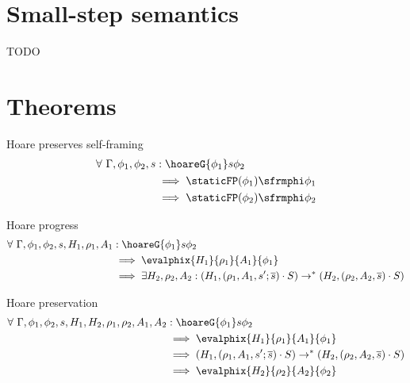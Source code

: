 \documentclass[11pt,a4paper]{scrbook}
\begin{document}
\section{Small-step semantics}
TODO

\section{Theorems}
Hoare preserves self-framing
\begin{align*}
\forall~ \Gamma, \phi_1, \phi_2, s &: \hoareG {\phi_1} s {\phi_2} 
\\ &\implies \staticFP(\phi_1) \sfrmphi \phi_1 
\\ &\implies \staticFP(\phi_2) \sfrmphi \phi_2
\end{align*}

Hoare progress
\begin{align*}
\forall~ \Gamma, \phi_1, \phi_2, s, H_1, \rho_1, A_1 &: \hoareG {\phi_1} s {\phi_2} 
\\ &\implies \evalphix {H_1} {\rho_1} {A_1} {\phi_1}
\\ &\implies \exists H_2, \rho_2, A_2 : (H_1, (\rho_1, A_1, s' ; \overline{s}) \cdot S)
							\rightarrow^* (H_2, (\rho_2, A_2, \overline{s}) \cdot S)
\end{align*}

Hoare preservation
\begin{align*}
\forall~ \Gamma, \phi_1, \phi_2, s, H_1, H_2, \rho_1, \rho_2, A_1, A_2 &: \hoareG {\phi_1} s {\phi_2} 
\\ &\implies \evalphix {H_1} {\rho_1} {A_1} {\phi_1}
\\ &\implies (H_1, (\rho_1, A_1, s' ; \overline{s}) \cdot S)
  \rightarrow^* (H_2, (\rho_2, A_2, \overline{s}) \cdot S)
\\ &\implies \evalphix {H_2} {\rho_2} {A_2} {\phi_2}
\end{align*}
\end{document}
